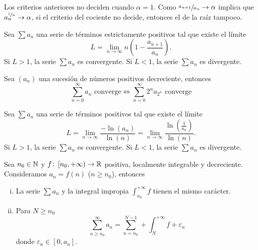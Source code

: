 \begin{obs}
    Los criterios anteriores no deciden cuando $\alpha = 1$. Como $\sfrac{a_{n+1}}{a_n} \to
    \alpha$ implica que $a_n^{\sfrac{1}{n}} \to \alpha$, si el criterio del cociente no
    decide, entonces el de la raíz tampoco.
\end{obs}

\begin{prop}
    Sea $\sum a_n$ una serie de términos estrictamente positivos tal que existe el límite
    \[
        L = \lim_{n \to \infty} n\left( 1 - \frac{a_{n+1}}{a_n} \right).
    \]
    Si $L > 1$, la serie $\sum a_n$ es convergente. Si $L < 1$, la serie $\sum a_n$ es
    divergente.
\end{prop}

\begin{prop*}
    Sea $(a_n)$ una sucesión de números positivos decreciente, entonces
    \[
        \sum_{n=0}^{\infty} a_n \text{ converge} \iff \sum_{n=0}^{\infty} 2^n a_{2^n}
        \text{ converge}
    \]
\end{prop*}

\begin{prop*}
    Sea $\sum a_n$ una serie de términos positivos tal que existe el límite
    \[
        L = \lim_{n \to \infty} \frac{- \ln(a_n)}{\ln(n)} = \lim_{n \to \infty}
        \frac{\ln\left( \frac{1}{a_n} \right)}{\ln(n)}.
    \]
    Si $L > 1$, la serie $\sum a_n$ es convergente. Si $L < 1$, la serie $\sum a_n$ es
    divergente.
\end{prop*}

\begin{prop}
    Sea $n_0 \in \mathbb{N}$ y $f \colon \left[ n_0, +\infty \right) \to \mathbb{R}$ positiva, localmente integrable
    y decreciente. Consideramos $a_n = f(n)$ ($n \geq n_0$), entonces
    \begin{enumerate}[i)]
        \item La serie $\sum a_n$ y la integral impropia
        $\int_{n_0}^{+\infty} f$ tienen el mismo carácter.
        \item Para $N \geq n_0$
        \[
            \sum_{n \geq n_0}^{\infty} a_n = \sum_{n = n_0}^{N-1} + \int_{N}^{+\infty}f +
            \varepsilon_n
        \]
        donde $\varepsilon_n \in [0, a_n]$.
    \end{enumerate}
\end{prop}


